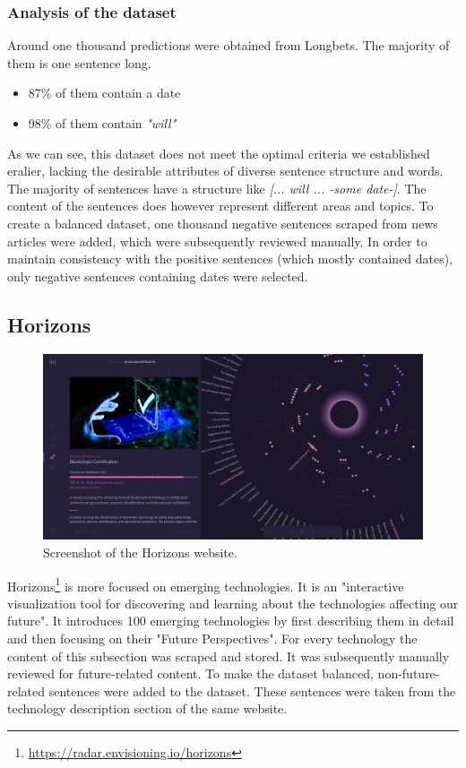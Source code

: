 \documentclass[a4paper,10pt]{report} %
\begin{document}
\subsubsection{Analysis of the dataset}
Around one thousand predictions were obtained from Longbets. The majority of them is one sentence long.
\begin{itemize}
  \item 87\% of them contain a date
  \item 98\% of them contain \textit{"will"}
\end{itemize}

As we can see, this dataset does not meet the optimal criteria we established eralier, lacking the desirable attributes of diverse sentence structure and words. The majority of sentences have a structure like \textit{[... will ... -some date-]}. The content of the sentences does however represent different areas and topics.     
To create a balanced dataset, one thousand negative sentences scraped from news articles were added, which were subsequently reviewed manually. In order to maintain consistency with the positive sentences (which mostly contained dates), only negative sentences containing dates were selected.



\subsection{Horizons}
\begin{figure}
  \centering
  \includegraphics[width=16cm]{img/horizons.png}
  \caption{Screenshot of the Horizons website.}
  \label{fig:horizons}
\end{figure}
Horizons\footnote{\url{https://radar.envisioning.io/horizons}} is more focused on emerging technologies. It is an "interactive visualization tool for discovering and learning about the technologies affecting our future". It introduces 100 emerging technologies by first describing them in detail and then focusing on their "Future Perspectives". For every technology the content of this subsection was scraped and stored. It was subsequently manually reviewed for future-related content.     
To make the dataset balanced, non-future-related sentences were added to the dataset. These sentences were taken from the technology description section of the same website.
\end{document}
